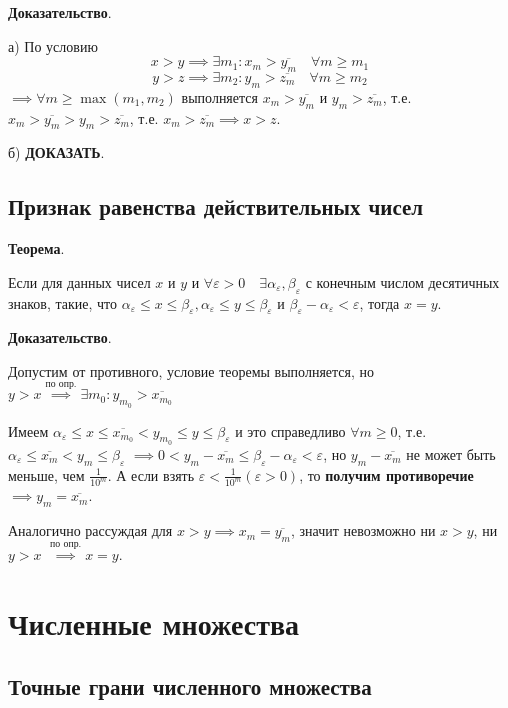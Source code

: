 \documentclass{article}
\begin{document}
\textbf{Доказательство}.

а) По условию 
\[x > y \implies \exists m_1: x_m > \overline{y_m} \quad \forall m \ge m_1\]
\[y > z \implies \exists m_2: y_m > \overline{z_m} \quad \forall m \ge m_2\]
$\implies \forall m \ge \max (m_1, m_2)$ выполняется $x_m > \overline{y_m}$
и $y_m > \overline{z_m}$, т.е. $x_m > \overline{y_m} > y_m > \overline{z_m}$,
т.е. $x_m > \overline{z_m} \implies x > z$.

б) \textbf{ДОКАЗАТЬ}.

\subsection{Признак равенства действительных чисел}

\textbf{Теорема}.

Если для данных чисел $x$ и $y$ и 
$\forall \varepsilon > 0 \quad \exists \alpha_{\varepsilon}, \beta_{\varepsilon}$
с конечным числом десятичных знаков, такие, что
$\alpha_{\varepsilon} \le x \le \beta_{\varepsilon}, \alpha_{\varepsilon} \le y \le \beta_{\varepsilon}$
и $\beta_{\varepsilon} - \alpha_{\varepsilon} < \varepsilon$, тогда $x = y$.

\textbf{Доказательство}.

Допустим от противного, условие теоремы выполняется, но 
$y > x \stackrel{\text{по опр.}}{\implies} \exists m_0: y_{m_0} > \overline{x_{m_0}}$

Имеем $\alpha_{\varepsilon} \le x \le \overline{x_{m_0}} < y_{m_0} \le y \le \beta_{\varepsilon}$
и это справедливо $\forall m \ge 0$, т.е. 
$\alpha_{\varepsilon} \le \overline{x_m} < y_m \le \beta_{\varepsilon}$
$\implies 0 < y_m - \overline{x_m} \le \beta_\varepsilon - \alpha_\varepsilon < \varepsilon$,
но $y_m - \overline{x_m}$ не может быть меньше, чем $\frac{1}{10^m}$. А если взять
$\varepsilon < \frac{1}{10^m} (\varepsilon > 0)$, то \textbf{получим противоречие}
$\implies y_m = \overline{x_m}$.

Аналогично рассуждая для $x > y \implies x_m = \overline{y_m}$, значит невозможно
ни $x > y$, ни $y > x$ $\stackrel{\text{по опр.}}{\implies} x = y$.

\section{Численные множества}

\subsection{Точные грани численного множества}
\end{document}

